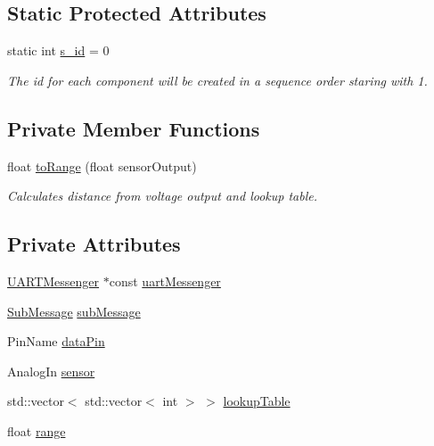 \subsection*{Static Protected Attributes}
\begin{DoxyCompactItemize}
\item 
static int \hyperlink{class_abstract_component_a99ce3e5fe7d73dac569b874c15fcaf0d}{s\+\_\+id} = 0
\begin{DoxyCompactList}\small\item\em The id for each component will be created in a sequence order staring with 1. \end{DoxyCompactList}\end{DoxyCompactItemize}
\subsection*{Private Member Functions}
\begin{DoxyCompactItemize}
\item 
float \hyperlink{class_i_r_sensor_analog_a33ed6c82b3cb6720bfdd6f7598c54699}{to\+Range} (float sensor\+Output)
\begin{DoxyCompactList}\small\item\em Calculates distance from voltage output and lookup table. \end{DoxyCompactList}\end{DoxyCompactItemize}
\subsection*{Private Attributes}
\begin{DoxyCompactItemize}
\item 
\hyperlink{class_u_a_r_t_messenger}{U\+A\+R\+T\+Messenger} $\ast$const \hyperlink{class_i_r_sensor_analog_abdd70ea1abffd1323989af062dab0aeb}{uart\+Messenger}
\item 
\hyperlink{struct_sub_message}{Sub\+Message} \hyperlink{class_i_r_sensor_analog_a6f3d8032be77b223aa78381c713197c3}{sub\+Message}
\item 
Pin\+Name \hyperlink{class_i_r_sensor_analog_a248c6a3f0a6a4e4867fd70c0ac0b3d76}{data\+Pin}
\item 
Analog\+In \hyperlink{class_i_r_sensor_analog_a90a5052f0d0f71bf2518fac4b5dd9dc0}{sensor}
\item 
std\+::vector$<$ std\+::vector$<$ int $>$ $>$ \hyperlink{class_i_r_sensor_analog_a981d91e0de8f658d5c15ac5bfbe8ed6c}{lookup\+Table}
\item 
float \hyperlink{class_i_r_sensor_analog_a7463c4bbf714764667ac9d7527ced012}{range}
\end{DoxyCompactItemize}


